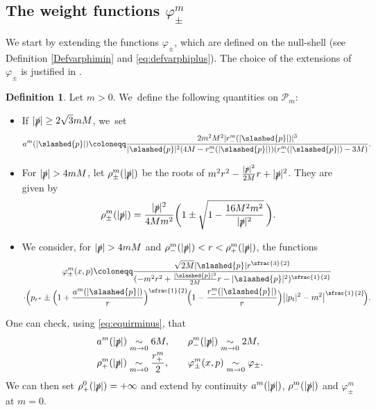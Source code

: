\documentclass[10pt]{amsart}
\theoremstyle{plain}
\theoremstyle{definition}
\newtheorem{definition}[proposition]{Definition}
\newcommand{\isEquivTo}[1]{\underset{#1}{\sim}}
\begin{document}
\subsection{The weight functions $\varphi_{\pm}^m$}

We start by extending the functions $\varphi_\pm$, which are defined on the null-shell (see Definition \ref{Defvarphimin} and \eqref{eq:defvarphiplus}). The choice of the extensions of $\varphi_\pm$ is justified in \cite[\S 5.1.4]{V24}.

\begin{definition}
Let $m > 0$. We~define the following quantities on $\mathcal{P}_m$:
\begin{itemize}
\item If $|\slashed{p}| \geq 2\sqrt{3}mM$, we~set
\[
a^m(|\slashed{p}|) \coloneqq \frac{2m^2M^2|r^{m}_-(|\slashed{p}|)|^3}{|\slashed{p}|^2(4M-r^{m}_-(|\slashed{p}|))(r^{m}_-(|\slashed{p}|)-3M)}.
\]
\item For $|\slashed{p}| >4mM$, let $\rho^m_{\pm}(|\slashed{p}|)$ be the roots of $m^2 r^2-\frac{|\slashed{p}|^2}{2M}r+|\slashed{p}|^2$. They are given by
\[
\rho_{\pm}^{m}(|\slashed{p}|)=\frac{|\slashed{p}|^2}{4Mm^2}\biggl(1\pm \sqrt{1-\frac{16M^2m^2}{|\slashed{p}|^2}} \, \biggr).
\]
\item We consider, for $|\slashed{p}| >4mM$ and $ \rho_{-}^{m}(|\slashed{p}|) < r < \rho_{+}^{m}(|\slashed{p}|)$, the functions
\begin{multline*}
\varphi_{\pm}^m(x,p) \coloneqq \frac{ \sqrt{2M}|\slashed{p}|r^{\sfrac{3}{2}}}{(-m^2r^2+\frac{|\slashed{p}|^2}{2M}r-|\slashed{p}|^2)^{\sfrac{1}{2}}}\\
\cdot\Bigl(p_{r^*}\pm\Bigl(1+\frac{a^{m}(|\slashed{p}|)}{r}\Bigr)^{\sfrac{1}{2}}\!\Bigl(1-\frac{r^{m}_-(|\slashed{p}|)}{r}\Bigr)\big||p_t|^2-m^2\big|^{\sfrac{1}{2}} \! \Bigr).
\end{multline*}
\end{itemize}
\end{definition}

One can check, using \eqref{eq:equirminus}, that\vspace*{-3pt}
\begin{equation}\label{eq:mto0}
\begin{alignedat}{2}
&a^m(|\slashed{p}|) \isEquivTo{m \to 0} 6M,\qquad &&\rho^m_-(|\slashed{p}|) \isEquivTo{m \to 0} 2M, \\[-3pt]
&\rho^m_+(|\slashed{p}|) \isEquivTo{m \to 0} \frac{r_+^m}{2}, \quad &&\varphi_\pm^m(x,p) \isEquivTo{m \to 0} \varphi_\pm.
\end{alignedat}
\end{equation}
We can then set $\rho^0_+(|\slashed{p}|)=+\infty$ and extend by continuity $a^m(|\slashed{p}|)$, $\rho_-^m(|\slashed{p}|)$ and $\varphi_\pm^m$ at $m=0$.
\end{document}
